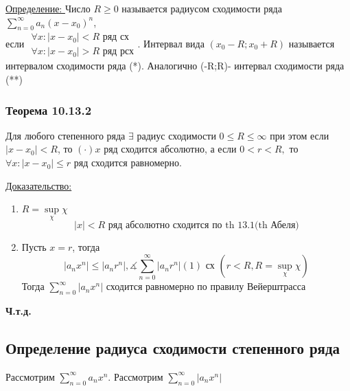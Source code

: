 \documentclass[12pt]{article}
\let\oldsum\sum
\renewcommand{\sum}{\oldsum\limits}
\begin{document}
    \underline{Определение: } Число $R\geq 0$ называется радиусом сходимости ряда $\sum_{n=0}^{\infty} a_n(x-x_0)^n$,
    \\
    если 
    $\begin{matrix}
      \forall x:|x-x_0|<R \text{ ряд сх}\\
      \forall x:|x-x_0|>R \text{ ряд рсх}
    \end{matrix}$. Интервал вида $(x_0-R;x_0+R)$ называется интервалом сходимости ряда (*). Аналогично (-R;R)-
    интервал сходимости ряда (**)

    \subsubsection*{Теорема 10.13.2}\label{th:10.13.2}
    \par\noindent
    Для любого степенного ряда $\exists$ радиус сходимости $0\leq R\leq\infty$ при
    этом если $|x-x_0|<R$, то $(\cdot) x$ ряд сходится абсолютно,
    а если $0<r<R,$ то $\forall x:|x-x_0|\leq r$ ряд сходится равномерно.
    
    \underline{Доказательство:}
    \begin{adjustwidth}{1.5em}{1.5em}
      \begin{enumerate}
        \item $R=\underset{\chi}{\sup}\chi$
        \[|x|<R \text{ ряд абсолютно сходится по th 13.1(th Абеля)}\]
        \item Пусть $x=r$, тогда 
        \[|a_nx^n|\leq|a_nr^n|, \measuredangle \sum_{n=0}^{\infty} |a_nr^n|(1)\text{ сх } (r<R,R=\underset{\chi}{\sup}\chi)\]
        Тогда $\sum_{n=0}^{\infty} |a_n x^n|$ сходится равномерно по правилу Вейерштрасса
      \end{enumerate}
    \end{adjustwidth}
    
    \begin{center}
      \textbf{Ч.т.д.}
    \end{center}

    \subsection{Определение радиуса сходимости степенного ряда}
    Рассмотрим $\sum_{n=0}^{\infty}a_nx^n$. Рассмотрим $\sum_{n=0}^{\infty} |a_nx^n|$
\end{document}
